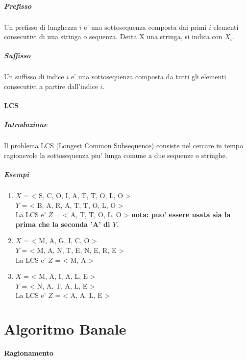 \subparagraph{Prefisso}

Un prefisso di lunghezza $i$ e' una sottosequenza composta dai primi $i$ elementi consecutivi di una stringa o sequenza.
Detta X una stringa, si indica con $X_{i}$.

\subparagraph{Suffisso}

Un suffisso di indice $i$ e' una sottosequenza composta da tutti gli elementi consecutivi a partire dall'indice $i$.

\paragraph{LCS}

\subparagraph{Introduzione}

Il problema LCS (Longest Common Subsequence) consiste nel cercare in tempo ragionevole la sottosequenza piu' lunga comune a due sequenze o stringhe.

\subparagraph{Esempi}

\begin{enumerate}

\item

$X$ = < S, C, O, I, A, T, T, O, L, O > \\
$Y$ = < B, A, R, A, T, T, O, L, O > \\
La LCS e' $Z$ = < A, T, T, O, L, O >
\textbf{nota: puo' essere usata sia la prima che la seconda 'A' di $Y$}.

\item

$X$ = < M, A, G, I, C, O > \\
$Y$ = < M, A, N, T, E, N, E, R, E > \\
La LCS e' $Z$ = < M, A >

\item

$X$ = < M, A, I, A, L, E > \\
$Y$ = < N, A, T, A, L, E > \\
La LCS e' $Z$ = < A, A, L, E >

\end{enumerate}

\section{Algoritmo Banale}

\paragraph{Ragionamento}

